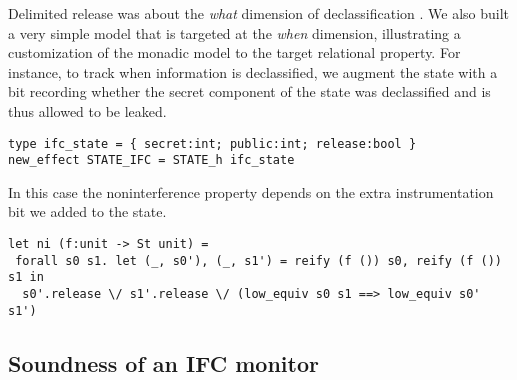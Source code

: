 \documentclass[sigplan,screen]{acmart}\settopmatter{}
\begin{document}



Delimited release was about the {\em what} dimension of
declassification \cite{SabelfeldS09}.
%
We also built a very simple model that is targeted at the {\em when}
dimension, illustrating a customization of the monadic model to the
target relational property.
%
For instance, to track when information is declassified, we augment
the state with a bit recording whether the secret component of the
state was declassified and is thus allowed to be leaked.
%
\begin{lstlisting}
type ifc_state = { secret:int; public:int; release:bool }
new_effect STATE_IFC = STATE_h ifc_state
\end{lstlisting}
%
In this case the noninterference property depends on the extra
instrumentation bit we added to the state.
%
\begin{lstlisting}
let ni (f:unit -> St unit) =
 forall s0 s1. let (_, s0'), (_, s1') = reify (f ()) s0, reify (f ()) s1 in
  s0'.release \/ s1'.release \/ (low_equiv s0 s1 ==> low_equiv s0' s1')
\end{lstlisting}

\subsection{Soundness of an IFC monitor}
\label{sec:ifc-monitor}
\end{document}
